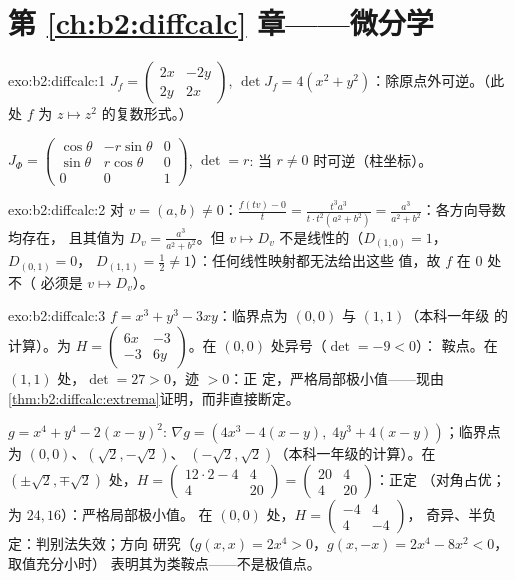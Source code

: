 \section*{第 \ref{ch:b2:diffcalc} 章——微分学}

\begin{solution}{exo:b2:diffcalc:1}
$J_f = \begin{pmatrix} 2x & -2y\\ 2y & 2x\end{pmatrix}$, $\det J_f
= 4(x^2 + y^2)$：除原点外可逆。（此处 $f$ 为 $z
\mapsto z^2$ 的复数形式。）

$J_\Phi = \begin{pmatrix} \cos\theta & -r\sin\theta & 0\\
\sin\theta & r\cos\theta & 0\\ 0 & 0 & 1\end{pmatrix}$, $\det = r$:
当 $r \neq 0$ 时可逆（柱坐标）。
\end{solution}

\begin{solution}{exo:b2:diffcalc:2}
对 $v = (a, b) \neq 0$：$\frac{f(tv) - 0}{t} = \frac{t^3a^3}{t\cdot
t^2(a^2+b^2)} = \frac{a^3}{a^2 + b^2}$：各方向导数均存在，
且其值为 $D_v = \frac{a^3}{a^2+b^2}$。但 $v
\mapsto D_v$ 不是线性的（$D_{(1,0)} = 1$，$D_{(0,1)} = 0$，
$D_{(1,1)} = \frac12 \neq 1$）：任何线性映射都无法给出这些
值，故 $f$ 在 $0$ 处不（
必须是 $v \mapsto D_v$）。
\end{solution}

\begin{solution}{exo:b2:diffcalc:3}
$f = x^3 + y^3 - 3xy$：临界点为 $(0,0)$ 与 $(1,1)$（本科一年级
的计算）。为 $H = \begin{pmatrix} 6x & -3\\ -3 &
6y\end{pmatrix}$。在 $(0,0)$ 处异号（$\det = -9 < 0$）：
鞍点。在 $(1,1)$ 处，$\det = 27 > 0$，迹 $> 0$：正
定，严格局部极小值——现由
\cref{thm:b2:diffcalc:extrema}证明，而非直接断定。

$g = x^4 + y^4 - 2(x-y)^2$: $\nabla g = (4x^3 - 4(x - y),\; 4y^3 +
4(x-y))$；临界点为 $(0,0)$、$(\sqrt2, -\sqrt2)$、
$(-\sqrt2, \sqrt2)$（本科一年级的计算）。在 $(\pm\sqrt2, \mp\sqrt2)$ 处，$H =
\begin{pmatrix} 12\cdot2 - 4 & 4\\ 4 & 20\end{pmatrix} =
\begin{pmatrix} 20 & 4\\ 4 & 20\end{pmatrix}$：正定
（对角占优；为 $24, 16$）：严格局部极小值。
在 $(0,0)$ 处，$H = \begin{pmatrix} -4 & 4\\ 4 & -4\end{pmatrix}$，
奇异、半负定：判别法失效；方向
研究（$g(x,x) = 2x^4 > 0$，$g(x,-x) = 2x^4 - 8x^2 < 0$，取值充分小时）
表明其为类鞍点——不是极值点。
\end{solution}

